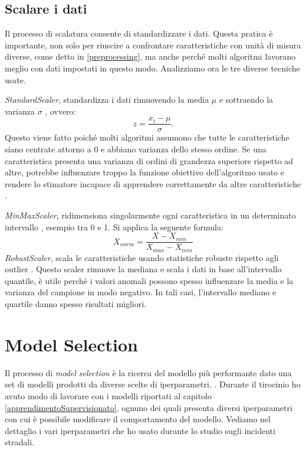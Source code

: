 \documentclass[12pt,italian]{report}
\begin{document}
\subsection{Scalare i dati}
Il processo di scalatura consente di standardizzare i dati. Questa pratica è importante, non solo per riuscire a confrontare caratteristiche con unità di misura diverse, come detto in \ref{preprocessing}, ma anche perché molti algoritmi lavorano meglio con dati impostati in questo modo.  
Analizziamo ora le tre diverse tecniche usate.

\emph{StandardScaler}, standardizza i dati rimuovendo la media $\mu$ e sottraendo la varianza $\sigma$ \cite{scikit-learn}, ovvero:
\begin{equation}
z = \frac{x_i - \mu}{\sigma}.
\end{equation}
Questo viene fatto poiché molti algoritmi assumono che tutte le caratteristiche siano centrate attorno a 0 e abbiano varianza dello stesso ordine. Se una caratteristica presenta una varianza di ordini di grandezza superiore rispetto ad altre, potrebbe influenzare troppo la funzione obiettivo dell'algoritmo usato e rendere lo stimatore incapace di apprendere correttamente da altre caratteristiche \cite{scikit-learn}.

\emph{MinMaxScaler}, ridimensiona singolarmente ogni caratteristica in un determinato intervallo \cite{scikit-learn}, esempio tra 0 e 1. Si applica la seguente formula:
\begin{equation}
X_{norm} = \frac{X - X_{min}}{X_{max} - X_{min}}
\end{equation}
\emph{RobustScaler}, scala le caratteristiche usando statistiche robuste rispetto agli outlier \cite{scikit-learn}. Questo scaler rimuove la mediana e scala i dati in base all'intervallo quantile, è utile perché i valori anomali possono spesso influenzare la media e la  varianza del campione in modo negativo. In tali casi, l'intervallo mediano e quartile danno spesso risultati migliori.

\section{Model Selection}
Il processo di \emph{model selection} è la ricerca del modello più performante dato una set di modelli prodotti da diverse scelte di iperparametri. \cite{Raschka2018ModelEM}.
Durante il tirocinio ho avuto modo di lavorare con i modelli riportati al capitolo \ref{apprendimentoSupervisionato}, ognuno dei quali presenta diversi iperparametri con cui è possibile modificare il comportamento del modello. Vediamo nel dettaglio i vari iperparametri che ho usato durante lo studio sugli incidenti stradali.
 
\end{document}
